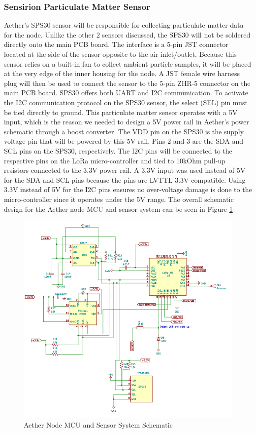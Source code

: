 \subsubsection{Sensirion Particulate Matter Sensor}
Aether's SPS30 sensor will be responsible for collecting particulate matter data for the node. Unlike the other 2 sensors discussed, the SPS30 will not be soldered directly onto the main PCB board. The interface is a 5-pin JST connector located at the side of the sensor opposite to the air inlet/outlet. Because this sensor relies on a built-in fan to collect ambient particle samples, it will be placed at the very edge of the inner housing for the node. A JST female wire harness plug will then be used to connect the sensor to the 5-pin ZHR-5 connector on the main PCB board. SPS30 offers both UART and I2C communication. To activate the I2C communication protocol on the SPS30 sensor, the select (SEL) pin must be tied directly to ground. This particulate matter sensor operates with a 5V input, which is the reason we needed to design a 5V power rail in Aether's power schematic through a boost converter. The VDD pin on the SPS30 is the supply voltage pin that will be powered by this 5V rail. Pins 2 and 3 are the SDA and SCL pins on the SPS30, respectively. The I2C pins will be connected to the respective pins on the LoRa micro-controller and tied to 10kOhm pull-up resistors connected to the 3.3V power rail. A 3.3V input was used instead of 5V for the SDA and SCL pins because the pins are LVTTL 3.3V compatible. Using 3.3V instead of 5V for the I2C pins ensures no over-voltage damage is done to the micro-controller since it operates under the 5V range. The overall schematic design for the Aether node MCU and sensor system can be seen in Figure \ref{fig:MCU_Sensor}

\begin{figure}
    \centering
    \includegraphics[scale=.75]{figures/MCU_Schematic.jpg}
    \caption{Aether Node MCU and Sensor System Schematic}
    \label{fig:MCU_Sensor} 
\end{figure}

